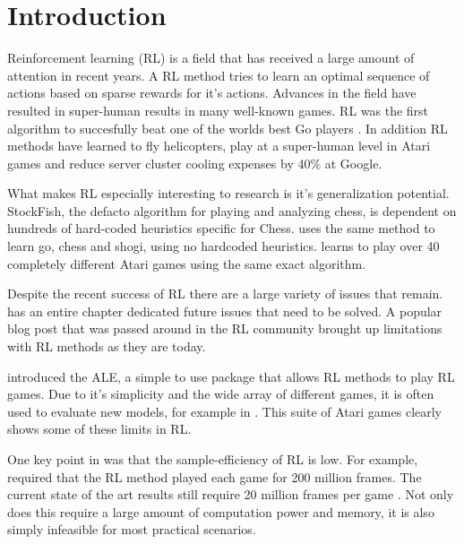 
\chapter{Introduction}\label{ch:intro}

Reinforcement learning (RL) is a field that has received a large amount of attention in recent years. A RL method tries to learn an optimal sequence of actions based on sparse rewards for it's actions. Advances in the field have resulted in super-human results in many well-known games. RL was the first algorithm to succesfully beat one of the worlds best Go players \citep{silver_2017}. In addition RL methods have learned to fly helicopters\citep{abbeel_2007}, play at a super-human level in Atari games \citep{mnih_2015} and reduce server cluster cooling expenses by 40\% at Google\citep{deepmind}.

What makes RL especially interesting to research is it's generalization potential.  StockFish, the defacto algorithm for playing and analyzing chess, is dependent on hundreds of hard-coded heuristics specific for Chess. \cite{silver_2017b} uses the same method to learn go, chess and shogi, using no hardcoded heuristics. \cite{mnih_2015} learns to play over 40 completely different Atari games using the same exact algorithm.

Despite the recent success of RL there are a large variety of issues that remain. \cite{sutton_barto_2018} has an entire chapter dedicated future issues that need to be solved. A popular blog post that was passed around in the RL community \citep{blog} brought up limitations with RL methods as they are today. 

\cite{bellemare_2013} introduced the ALE, a simple to use package that allows RL methods to play RL games.  Due to it's simplicity and the wide array of different games, it is often used to evaluate new models, for example in \cite{mnih_2015}. This suite of Atari games clearly shows some of these limits in RL. 

One key point in \cite{blog} was that the sample-efficiency of RL is low. For example, \cite{mnih_2015} required that the RL method played each game for 200 million frames. The current state of the art results still require 20 million frames per game \citep{hessel_2017}. Not only does this require a large amount of computation power and memory, it is also simply infeasible for most practical scenarios.

